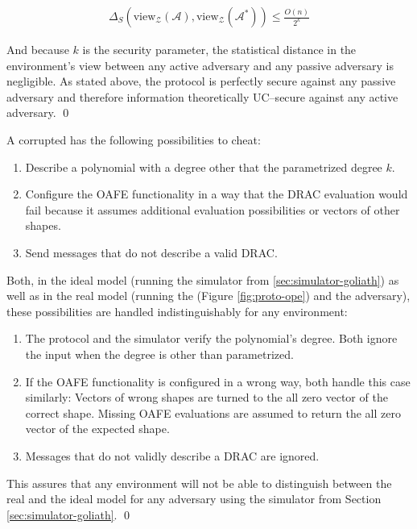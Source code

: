 \begin{align*}
  \Delta_S(\text{view}_\mathcal{Z}(\mathcal{A}),
  \text{view}_\mathcal{Z}(\mathcal{A}^*))
  \leq \frac{O(n)}{2^k}
\end{align*}

\noindent{}And because $k$ is the security parameter, the statistical distance
in the environment's view between any active adversary and any passive adversary
is negligible. As stated above, the protocol is perfectly secure against any
passive adversary and therefore information theoretically UC--secure against any
active adversary. \qed



A corrupted \JWpOne{} has the following possibilities to cheat:

\begin{enumerate}

  \item Describe a polynomial with a degree other that the parametrized degree
    $k$.

  \item Configure the OAFE functionality in a way that the DRAC evaluation would
    fail because it assumes additional evaluation possibilities or vectors of
    other shapes.

  \item Send messages that do not describe a valid DRAC\@.

\end{enumerate}

\noindent{}Both, in the ideal model (running the simulator from
\ref{sec:simulator-goliath}) as well as in the real model (running the
\JWprotoSymOPE{} (Figure \ref{fig:proto-ope}) and the adversary), these
possibilities are handled indistinguishably for any environment:

\begin{enumerate}

  \item The protocol and the simulator verify the polynomial's degree.
    Both ignore the input when the degree is other than parametrized.

  \item If the OAFE functionality is configured in a wrong way, both handle this
    case similarly: Vectors of wrong shapes are turned to the all zero vector of
    the correct shape. Missing OAFE evaluations are assumed to return the all
    zero vector of the expected shape.

  \item Messages that do not validly describe a DRAC are ignored.

\end{enumerate}

\noindent{}This assures that any environment will not be able to distinguish
between the real and the ideal model for any adversary using the simulator from
Section \ref{sec:simulator-goliath}. \qed{}

